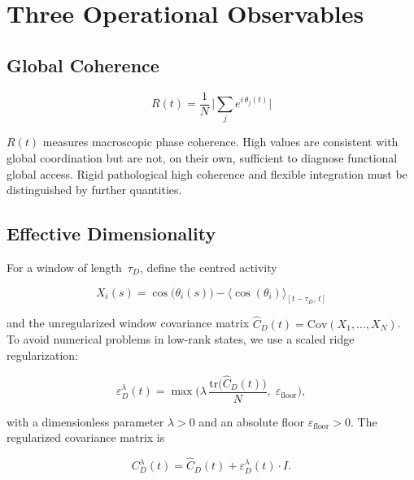 \documentclass[11pt,a4paper]{article}
\theoremstyle{plain}
\theoremstyle{definition}
\theoremstyle{remark}
\begin{document}
\section{Three Operational Observables}
\label{sec:observablen}

\subsection{Global Coherence}

\begin{equation}
\label{eq:R}
R(t) = \frac{1}{N}\,\biggl|\sum_{j} e^{i\,\theta_j(t)}\biggr|
\end{equation}

$R(t)$ measures macroscopic phase coherence. High values are consistent with global coordination but are not, on their own, sufficient to diagnose functional global access. Rigid pathological high coherence and flexible integration must be distinguished by further quantities.

\subsection{Effective Dimensionality}

For a window of length~$\tau_D$, define the centred activity

\begin{equation}
X_i(s) = \cos\!\bigl(\theta_i(s)\bigr) - \bigl\langle\cos(\theta_i)\bigr\rangle_{[t-\tau_D,\,t]}
\end{equation}

and the unregularized window covariance matrix $\hat{C}_D(t) = \mathrm{Cov}(X_1,\ldots,X_N)$. To avoid numerical problems in low-rank states, we use a scaled ridge regularization:

\begin{equation}
\label{eq:ridge}
\varepsilon_D^{\lambda}(t) = \max\!\biggl(\lambda\,\frac{\mathrm{tr}\bigl(\hat{C}_D(t)\bigr)}{N},\;\varepsilon_{\mathrm{floor}}\biggr),
\end{equation}

with a dimensionless parameter $\lambda > 0$ and an absolute floor $\varepsilon_{\mathrm{floor}} > 0$. The regularized covariance matrix is

\begin{equation}
C_D^{\lambda}(t) = \hat{C}_D(t) + \varepsilon_D^{\lambda}(t)\cdot I.
\end{equation}
\end{document}
